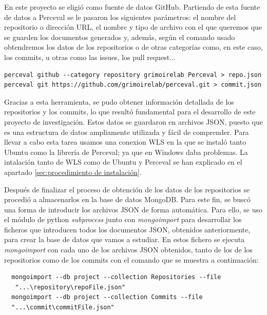\documentclass[a4paper, 12pt]{book}
\begin{document}
En este proyecto se eligió como fuente de datos GitHub. 
Partiendo de esta fuente de datos a Perceval se le pasaron los siguientes parámetros: el nombre del repositorio o dirección URL, el nombre y tipo de archivo con el que queremos que se guarden los documentos generados y, además, según el comando usado obtendremos los datos de los repositorios o de otras categorías como, en este caso, los commits, u otras como las issues, los pull request...
\begin{verbatim}
perceval github --category repository grimoirelab Perceval > repo.json
perceval git https://github.com/grimoirelab/perceval.git > commit.json
\end{verbatim} 
    

Gracias a esta herramienta, se pudo obtener información detallada de los repositorios y los commits, lo que resultó fundamental para el desarrollo de este proyecto de investigación.
Estos datos se guardaron en archivos JSON, puesto que es una estructura de datos ampliamente utilizada y fácil de comprender.
Para llevar a cabo esta tarea usamos una conexion WLS en la que se instaló tanto Ubuntu como la librería de Perceval; ya que en Windows daba problemas.
La intalación tanto de WLS como de Ubuntu y Perceval se han explicado en el apartado \ref{sec:procedimiento de instalación}.

Después de finalizar el proceso de obtención de los datos de los repositorios se procedió a almacenarlos en la base de datos MongoDB.
Para este fin, se buscó una forma de introducir los archivos JSON de forma automática. 
Para ello, se uso el módulo de python \emph{subprocess} junto con \emph{mongoimport} para desarrollar los ficheros que introducen todos los documentos JSON, obtenidos anteriormente, para crear la base de datos que vamos a estudiar.
En estos fichero se ejecuta \emph{mongoimport} con cada uno de los archivos JSON obtenidos, tanto de los de los repositorios como de los commits con el comando que se muestra a continuación:
\begin{verbatim}
  mongoimport --db project --collection Repositories --file
   "...\repository\repoFile.json"
  mongoimport --db project --collection Commits --file 
  "...\commit\commitFile.json"
\end{verbatim}
\end{document}
